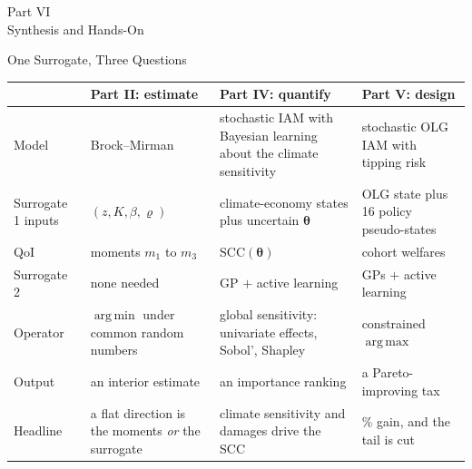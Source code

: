 \documentclass[aspectratio=169,11pt]{beamer}
\newcommand{\str}{\bm{\theta}}          %
\DeclareMathOperator*{\argmin}{arg\,min}
\DeclareMathOperator*{\argmax}{arg\,max}
\begin{document}
\begin{frame}{}
\begin{center}
{\Huge \textcolor{uzhblue}{Part VI}}\\[0.8em]
{\LARGE Synthesis and Hands-On}
\end{center}
\end{frame}

\begin{frame}{One Surrogate, Three Questions}
\footnotesize
\begin{center}
\setlength{\tabcolsep}{3pt}
\begin{tabular}{>{\raggedright\arraybackslash}p{}>{\raggedright\arraybackslash}p{}>{\raggedright\arraybackslash}p{}>{\raggedright\arraybackslash}p{}}
\toprule
 & \textbf{Part II: estimate} & \textbf{Part IV: quantify} & \textbf{Part V: design} \\
\midrule
Model & Brock--Mirman & stochastic IAM with Bayesian learning about the climate sensitivity & stochastic OLG IAM with tipping risk \\
Surrogate 1 inputs & $(z, K, \beta, \varrho)$ & climate-economy states plus uncertain $\str$ & OLG state plus 16 policy pseudo-states \\
QoI & moments $m_1$ to $m_3$ & $\mathrm{SCC}(\str)$ & 40 cohort welfares \\
Surrogate 2 & none needed & GP $+$ active learning & 40 GPs $+$ active learning \\
Operator & $\argmin$ under common random numbers & global sensitivity: univariate effects, Sobol', Shapley & constrained $\argmax$ \\
Output & an interior estimate & an importance ranking & a Pareto-improving tax \\
Headline & a flat direction is the moments \emph{or} the surrogate & climate sensitivity and damages drive the SCC & 0.42\% gain, and the tail is cut \\
\bottomrule
\end{tabular}
\end{center}
\end{frame}
\end{document}
